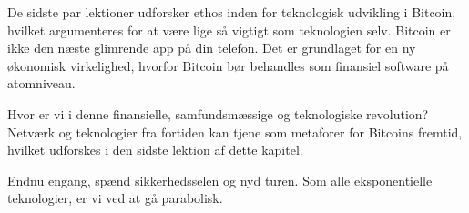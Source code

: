 De sidste par lektioner udforsker ethos inden for teknologisk udvikling i
Bitcoin, hvilket argumenteres for at være lige så vigtigt som teknologien selv. 
Bitcoin er ikke den næste glimrende app på din telefon. Det er grundlaget for 
en ny økonomisk virkelighed, hvorfor Bitcoin bør behandles som finansiel 
software på atomniveau.

Hvor er vi i denne finansielle, samfundsmæssige og teknologiske revolution? 
Netværk og teknologier fra fortiden kan tjene som metaforer for Bitcoins 
fremtid, hvilket udforskes i den sidste lektion af dette kapitel.

Endnu engang, spænd sikkerhedsselen og nyd turen. Som alle eksponentielle 
teknologier, er vi ved at gå parabolisk.